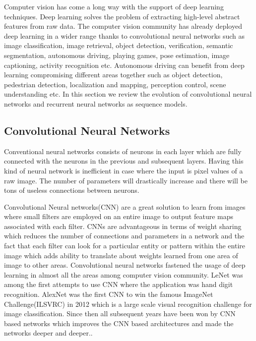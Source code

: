 Computer vision has come a long way with the support of deep learning techniques. Deep learning solves the problem of extracting high-level abstract features from raw data\cite{goodfellow2016deep}. The computer vision community has already deployed deep learning in a wider range thanks to convolutional neural networks such as image classification, image retrieval, object detection, verification, semantic segmentation, autonomous driving, playing games, pose estimation,  image captioning, activity recognition etc. \cite{lecun1998gradient, krizhevsky2012imagenet, ren2015faster, long2015fully, xu2016end, taigman2014deepface,mnih2010learning, toshev2014deeppose,mnih2013playing,sermanet2011traffic} Autonomous driving can benefit from deep learning compromising different areas together such as object detection, pedestrian detection, localization and mapping, perception control, scene understanding etc. In this section we review the evolution of convolutional neural networks and recurrent neural networks as sequence models.

\subsection{Convolutional Neural Networks}
\label{se:cnn}

Conventional neural networks consists of neurons in each layer which are fully connected with the neurons in the previous and subsequent layers. Having this kind of neural network is inefficient in case where the input is pixel values of a raw image. The number of parameters will drastically increase and there will be tons of useless connections between neurons.
 
Convolutional Neural networks(CNN)\cite{lecun1989backpropagation} are a great solution to learn from images where small filters are employed on an entire image to output feature maps associated with each filter. CNNs are advantageous in terms of weight sharing which reduces the number of connections and parameters in a network and the fact that each filter can look for a particular entity or pattern within the entire image which adds ability to translate about weights learned from one area of image to other areas. Convolutional neural networks fastened the usage of deep learning in almost all the areas among computer vision community. LeNet\cite{lecun1998gradient} was among the first attempts to use CNN where the application was hand digit recognition. AlexNet\cite{krizhevsky2012imagenet} was the first CNN to win the famous ImageNet Challenge(ILSVRC)\cite{russakovsky2015imagenet} in 2012 which is a large scale visual recognition challenge for image classification. Since then all subsequent years have been won by CNN based networks which improves the CNN based architectures and made the networks deeper and deeper.\cite{zeiler2014visualizing, simonyan2014very, szegedy2015going, he2016deep, hu2017squeeze}. 

